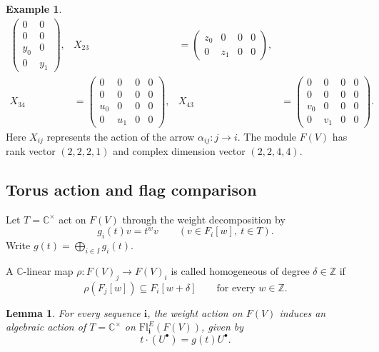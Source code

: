 \documentclass[12pt,reqno]{amsart}
\numberwithin{equation}{section}
\newtheorem{lemma}[theorem]{Lemma}
\theoremstyle{definition}
\newtheorem{example}[theorem]{Example}
\theoremstyle{remark}
\theoremstyle{plain}
\theoremstyle{plain}
\begin{document}
\begin{example}
\[\begin{aligned}
\begin{pmatrix}
        0&0\\
        0&0\\
        y_0&0\\
        0&y_1
    \end{pmatrix},
    &
    X_{23}
    &=
    \begin{pmatrix}
        z_0&0&0&0\\
        0&z_1&0&0
    \end{pmatrix},
    \\[3mm]
    X_{34}
    &=
    \begin{pmatrix}
        0&0&0&0\\
        0&0&0&0\\
        u_0&0&0&0\\
        0&u_1&0&0
    \end{pmatrix},
    &
    X_{43}
    &=
    \begin{pmatrix}
        0&0&0&0\\
        0&0&0&0\\
        v_0&0&0&0\\
        0&v_1&0&0
    \end{pmatrix}.
\end{aligned}
\]
Here $X_{ij}$ represents the action of the arrow $\alpha_{ij}\colon j\to i$. The module $F(V)$ has rank vector $(2,2,2,1)$ and complex dimension vector $(2,2,4,4)$.
\end{example}

\subsection{Torus action and flag comparison}
\label{subsec:flag-comparison}
Let $T=\mathbb C^\times$ act on $F(V)$ through the weight decomposition by
\[
    g_i(t)v=t^w v
    \qquad
    (v\in F_i[w],\ t\in T).
\]
Write $g(t)=\bigoplus_{i\in I}g_i(t)$. 

A $\mathbb C$-linear map $\rho\colon F(V)_j\to F(V)_i$ is called homogeneous of degree $\delta\in\mathbb Z$ if
\[
    \rho(F_j[w])\subseteq F_i[w+\delta]
    \qquad\text{for every }w\in\mathbb Z.
\]

\begin{lemma}\label{lem:torus-action}
For every sequence $\mathbf i$, the weight action
on $F(V)$ induces an algebraic action of
$T=\mathbb C^\times$ on
$\mathrm{Fl}_{\mathbf i}^{E}(F(V))$, given by
\[
    t\cdot(U^\bullet)=g(t)U^\bullet.
\]
\end{lemma}
\end{document}
